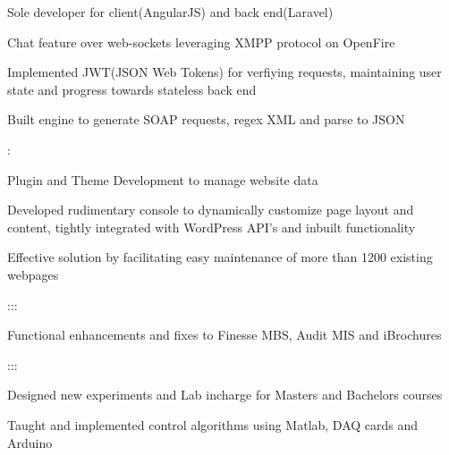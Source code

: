 \documentclass[]{hemant-style}
\begin{document}
\begin{minipage}[]{\textwidth}
\begin{minipage}{\textwidth}
\begin{minipage}[t][][c]{.75\textwidth}
                            \begin{hitemize}
                                \item Sole developer for client(AngularJS) and back end(Laravel)
                                \item Chat feature over web-sockets leveraging XMPP protocol on OpenFire
                                \item Implemented JWT(JSON Web Tokens) for verfiying requests, maintaining user state and progress towards stateless back end
                                \item Built engine to generate SOAP requests, regex XML and parse to JSON 
                            \end{hitemize}
                            :
                            \begin{hitemize}
                                \item Plugin and Theme Development to manage website data
                                \item Developed rudimentary console to dynamically customize page layout and content, tightly integrated with WordPress API's and inbuilt functionality
                                \item Effective solution by facilitating easy maintenance of more than 1200 existing webpages
                            \end{hitemize}
                            :::
                            \begin{hitemize}
                                \item Functional enhancements and fixes to Finesse MBS, Audit MIS and iBrochures
                            \end{hitemize}
                            :::
                            \begin{hitemize}
                                \item Designed new experiments and Lab incharge for Masters and Bachelors courses
                                \item Taught and implemented control algorithms using Matlab, DAQ cards and Arduino
                            \end{hitemize}

\end{minipage}
\end{minipage}
\end{minipage}
\end{document}
